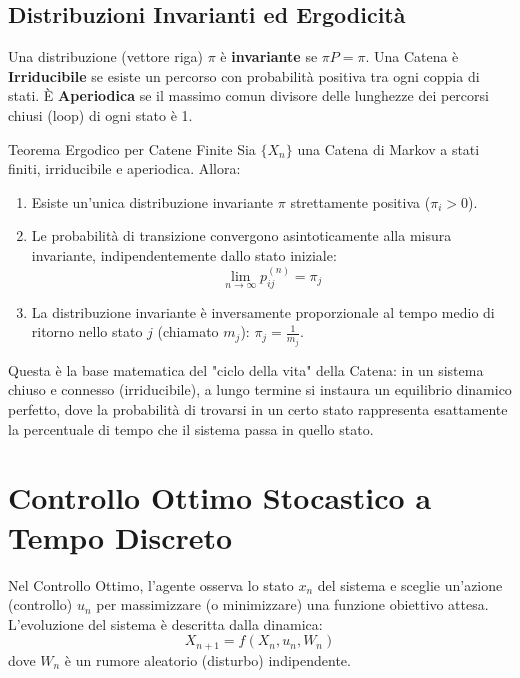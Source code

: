 \documentclass[11pt,a4paper]{article}
\begin{document}
\subsection{Distribuzioni Invarianti ed Ergodicità}

Una distribuzione (vettore riga) $\pi$ è \textbf{invariante} se $\pi P = \pi$.
Una Catena è \textbf{Irriducibile} se esiste un percorso con probabilità positiva tra ogni coppia di stati. È \textbf{Aperiodica} se il massimo comun divisore delle lunghezze dei percorsi chiusi (loop) di ogni stato è 1.

\begin{teorema}{Teorema Ergodico per Catene Finite}{}
Sia $\{X_n\}$ una Catena di Markov a stati finiti, irriducibile e aperiodica. Allora:
\begin{enumerate}
    \item Esiste un'unica distribuzione invariante $\pi$ strettamente positiva ($\pi_i > 0$).
    \item Le probabilità di transizione convergono asintoticamente alla misura invariante, indipendentemente dallo stato iniziale:
    \[ \lim_{n \to \infty} p_{ij}^{(n)} = \pi_j \]
    \item La distribuzione invariante è inversamente proporzionale al tempo medio di ritorno nello stato $j$ (chiamato $m_j$): $\pi_j = \frac{1}{m_j}$.
\end{enumerate}
\end{teorema}
\begin{intuizione}
Questa è la base matematica del "ciclo della vita" della Catena: in un sistema chiuso e connesso (irriducibile), a lungo termine si instaura un equilibrio dinamico perfetto, dove la probabilità di trovarsi in un certo stato rappresenta esattamente la percentuale di tempo che il sistema passa in quello stato.
\end{intuizione}

\newpage
\section{Controllo Ottimo Stocastico a Tempo Discreto}

Nel Controllo Ottimo, l'agente osserva lo stato $x_n$ del sistema e sceglie un'azione (controllo) $u_n$ per massimizzare (o minimizzare) una funzione obiettivo attesa.
L'evoluzione del sistema è descritta dalla dinamica:
\[ X_{n+1} = f(X_n, u_n, W_n) \]
dove $W_n$ è un rumore aleatorio (disturbo) indipendente.
\end{document}
